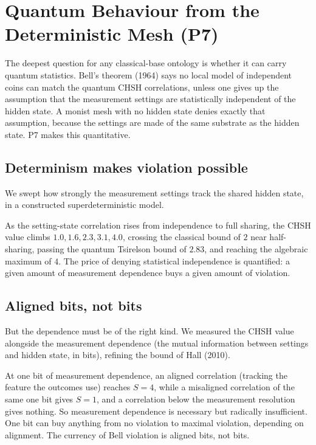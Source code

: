 \section{Quantum Behaviour from the Deterministic Mesh (P7)}
\label{sec:quantum}

The deepest question for any classical-base ontology is whether it can carry quantum statistics. Bell's theorem (1964) says no local model of independent coins can match the quantum CHSH correlations, unless one gives up the assumption that the measurement settings are statistically independent of the hidden state. A monist mesh with no hidden state denies exactly that assumption, because the settings are made of the same substrate as the hidden state. P7 makes this quantitative.

\subsection{Determinism makes violation possible}

We swept how strongly the measurement settings track the shared hidden state, in a constructed superdeterministic model.

\begin{result}
As the setting-state correlation rises from independence to full sharing, the CHSH value climbs $1.0, 1.6, 2.3, 3.1, 4.0$, crossing the classical bound of $2$ near half-sharing, passing the quantum Tsirelson bound of $2.83$, and reaching the algebraic maximum of $4$. The price of denying statistical independence is quantified: a given amount of measurement dependence buys a given amount of violation.
\end{result}

\subsection{Aligned bits, not bits}

But the dependence must be of the right kind. We measured the CHSH value alongside the measurement dependence (the mutual information between settings and hidden state, in bits), refining the bound of Hall (2010).

\begin{result}
At one bit of measurement dependence, an aligned correlation (tracking the feature the outcomes use) reaches $S = 4$, while a misaligned correlation of the same one bit gives $S = 1$, and a correlation below the measurement resolution gives nothing. So measurement dependence is necessary but radically insufficient. One bit can buy anything from no violation to maximal violation, depending on alignment. The currency of Bell violation is aligned bits, not bits.
\end{result}

